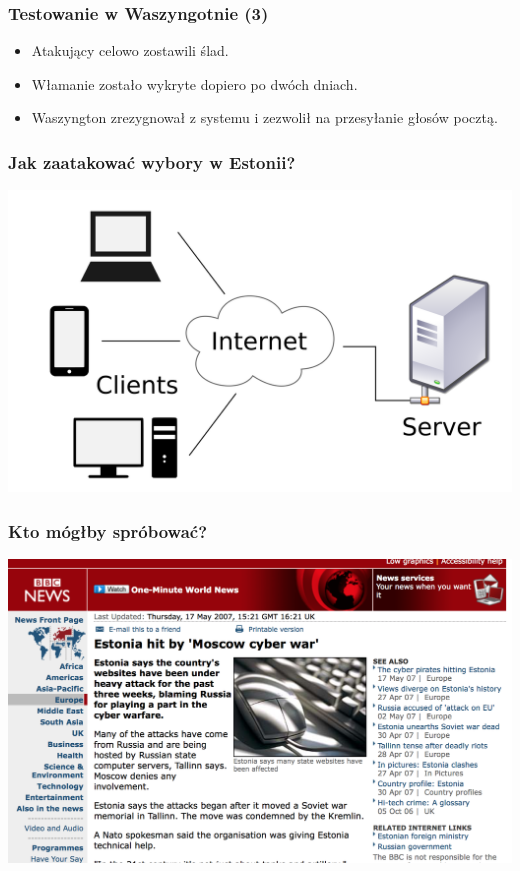\documentclass{beamer}
\begin{document}
\begin{frame}
\frametitle{Testowanie w Waszyngotnie (3)}
\begin{itemize}
\item Atakujący celowo zostawili ślad.\pause
\item Włamanie zostało wykryte dopiero po dwóch dniach.\pause
\item Waszyngton zrezygnował z systemu i zezwolił na przesyłanie głosów pocztą.
\end{itemize}
\end{frame}

\begin{frame}
\frametitle{Jak zaatakować wybory w Estonii?}
\includegraphics[height=0.8\paperheight, center]{client-server}
\end{frame}

\begin{frame}
\frametitle{Kto mógłby spróbować?}
\includegraphics[height=0.8\paperheight, center]{cyberwar}
\end{frame}
\end{document}
